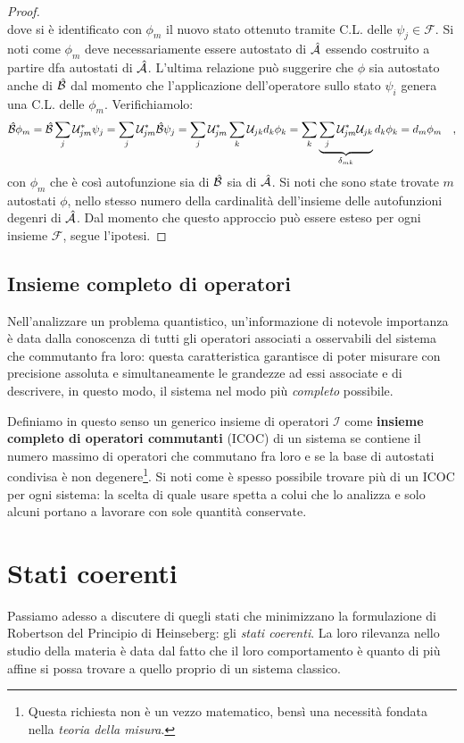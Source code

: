 \begin{proof}
\[    \]
    dove si è identificato con $\phi_m$ il nuovo stato ottenuto tramite C.L. delle $\psi_j \in \mathcal{F}$. Si noti come $\phi_m$ deve necessariamente essere autostato di $\hat{\mathcal{A}}$ essendo costruito a partire dfa autostati di $\hat{\mathcal{A}}$. L'ultima relazione può suggerire che $\phi$ sia autostato anche di $\hat{\mathcal{B}}$ dal momento che l'applicazione dell'operatore sullo stato $\psi_i$ genera una C.L. delle $\phi_m$. Verifichiamolo:
    \[
        \hat{\mathcal{B}}\phi_m = \hat{\mathcal{B}} \sum_j \mathcal{U}^*_{jm} \psi_j = \sum_j \mathcal{U}^*_{jm} \hat{\mathcal{B}}\psi_j = \sum_j \mathcal{U}^*_{jm} \sum_k \mathcal{U}_{jk} d_k \phi_k =\sum_k\underbrace{\sum_j \mathcal{U}^*_{jm}\mathcal{U}_{jk}}_{\delta_{mk}} d_k \phi_k = d_m \phi_m \quad,
    \]
    con $\phi_m$ che è così autofunzione sia di $\hat{\mathcal{B}}$ sia di $\hat{\mathcal{A}}$. Si noti che sono state trovate $m$ autostati $\phi$, nello stesso numero della cardinalità dell'insieme delle autofunzioni degenri di $\hat{\mathcal{A}}$. Dal momento che questo approccio può essere esteso per ogni insieme $\mathcal{F}$, segue l'ipotesi.
\end{proof}

\subsection{Insieme completo di operatori}
Nell'analizzare un problema quantistico, un'informazione di notevole importanza è data dalla conoscenza di tutti gli operatori associati a osservabili del sistema che commutanto fra loro: questa caratteristica garantisce di poter misurare con precisione assoluta e simultaneamente le grandezze ad essi associate e di descrivere, in questo modo, il sistema nel modo più \emph{completo} possibile. 

Definiamo in questo senso un generico insieme di operatori $\mathcal{I}$ come \textbf{insieme completo di operatori commutanti} (ICOC) di un sistema se contiene il numero massimo di operatori che commutano fra loro e se la base di autostati condivisa è non degenere\footnote{Questa richiesta non è un vezzo matematico, bensì una necessità fondata nella \emph{teoria della misura}.}. Si noti come è spesso possibile trovare più di un ICOC per ogni sistema: la scelta di quale usare spetta a colui che lo analizza e solo alcuni portano a lavorare con sole quantità conservate.

\section{Stati coerenti}
Passiamo adesso a discutere di quegli stati che minimizzano la formulazione di Robertson del Principio di Heinseberg: gli \emph{stati coerenti}. La loro rilevanza nello studio della materia è data dal fatto che il loro comportamento è quanto di più affine si possa trovare a quello proprio di un sistema classico. 

